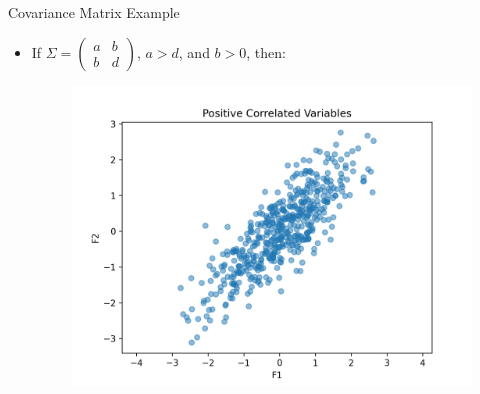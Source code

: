 \documentclass[serif, aspectratio=169]{beamer}
\begin{document}
\begin{frame}{Covariance Matrix Example}
    \begin{itemize}         
        \item If $\Sigma = 
\begin{pmatrix}
a & b  \\
b & d 
\end{pmatrix}$, $a > d$, and $b > 0$, then: 
        \begin{figure}[htpb]
            \begin{center}
         \includegraphics[keepaspectratio, scale=0.5]{pic/positive_correlated_variables.png}
            \end{center}
        \end{figure}
    \end{itemize}
\end{frame}
\end{document}
